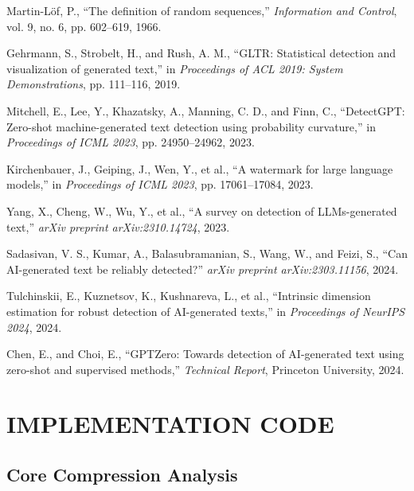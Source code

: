 \documentclass[12pt,a4paper]{report}
\begin{document}
\begin{thebibliography}{99}
Martin-Löf, P., ``The definition of random sequences,'' \textit{Information and Control}, vol. 9, no. 6, pp. 602--619, 1966.

Gehrmann, S., Strobelt, H., and Rush, A. M., ``GLTR: Statistical detection and visualization of generated text,'' in \textit{Proceedings of ACL 2019: System Demonstrations}, pp. 111--116, 2019.

Mitchell, E., Lee, Y., Khazatsky, A., Manning, C. D., and Finn, C., ``DetectGPT: Zero-shot machine-generated text detection using probability curvature,'' in \textit{Proceedings of ICML 2023}, pp. 24950--24962, 2023.

Kirchenbauer, J., Geiping, J., Wen, Y., et al., ``A watermark for large language models,'' in \textit{Proceedings of ICML 2023}, pp. 17061--17084, 2023.

Yang, X., Cheng, W., Wu, Y., et al., ``A survey on detection of LLMs-generated text,'' \textit{arXiv preprint arXiv:2310.14724}, 2023.

Sadasivan, V. S., Kumar, A., Balasubramanian, S., Wang, W., and Feizi, S., ``Can AI-generated text be reliably detected?'' \textit{arXiv preprint arXiv:2303.11156}, 2024.

Tulchinskii, E., Kuznetsov, K., Kushnareva, L., et al., ``Intrinsic dimension estimation for robust detection of AI-generated texts,'' in \textit{Proceedings of NeurIPS 2024}, 2024.

Chen, E., and Choi, E., ``GPTZero: Towards detection of AI-generated text using zero-shot and supervised methods,'' \textit{Technical Report}, Princeton University, 2024.

\end{thebibliography}

\appendix

\appendix
\chapter{IMPLEMENTATION CODE}

\section{Core Compression Analysis}
\end{document}
